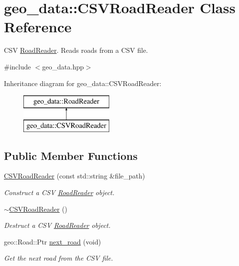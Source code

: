 \hypertarget{classgeo__data_1_1CSVRoadReader}{}\section{geo\+\_\+data\+:\+:C\+S\+V\+Road\+Reader Class Reference}
\label{classgeo__data_1_1CSVRoadReader}


C\+SV \hyperlink{classgeo__data_1_1RoadReader}{Road\+Reader}. Reads roads from a C\+SV file.  




{\ttfamily \#include $<$geo\+\_\+data.\+hpp$>$}

Inheritance diagram for geo\+\_\+data\+:\+:C\+S\+V\+Road\+Reader\+:\begin{figure}[H]
\begin{center}
\leavevmode
\includegraphics[height=2.000000cm]{classgeo__data_1_1CSVRoadReader}
\end{center}
\end{figure}
\subsection*{Public Member Functions}
\begin{DoxyCompactItemize}
\item 
\hyperlink{classgeo__data_1_1CSVRoadReader_acea18148fa1db97efbade81b780e5312}{C\+S\+V\+Road\+Reader} (const std\+::string \&file\+\_\+path)
\begin{DoxyCompactList}\small\item\em Construct a C\+SV \hyperlink{classgeo__data_1_1RoadReader}{Road\+Reader} object. \end{DoxyCompactList}\item 
\hyperlink{classgeo__data_1_1CSVRoadReader_a3061db500f28034ee2e6faa5bb6a6d45}{$\sim$\+C\+S\+V\+Road\+Reader} ()\hypertarget{classgeo__data_1_1CSVRoadReader_a3061db500f28034ee2e6faa5bb6a6d45}{}\label{classgeo__data_1_1CSVRoadReader_a3061db500f28034ee2e6faa5bb6a6d45}

\begin{DoxyCompactList}\small\item\em Destruct a C\+SV \hyperlink{classgeo__data_1_1RoadReader}{Road\+Reader} object. \end{DoxyCompactList}\item 
geo\+::\+Road\+::\+Ptr \hyperlink{classgeo__data_1_1CSVRoadReader_af926c0827d3fa38fbf26b4557184fecf}{next\+\_\+road} (void)
\begin{DoxyCompactList}\small\item\em Get the next road from the C\+SV file. \end{DoxyCompactList}\end{DoxyCompactItemize}
